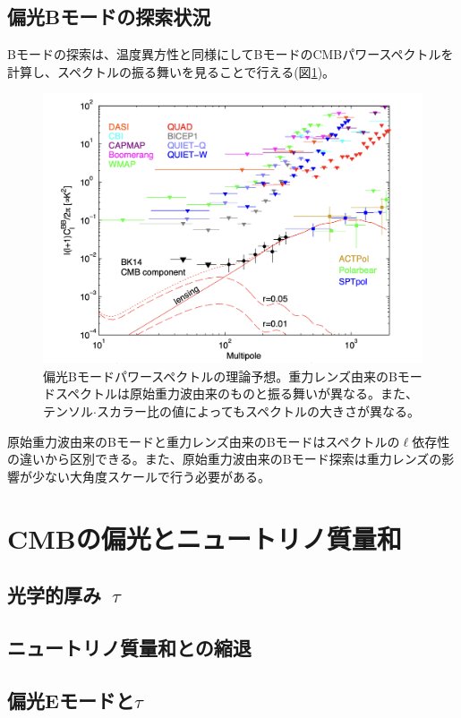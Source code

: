 \subsection{偏光Bモードの探索状況}
Bモードの探索は、温度異方性と同様にしてBモードのCMBパワースペクトルを計算し、スペクトルの振る舞いを見ることで行える(図\ref{bicep_paper})。
\begin{figure}[htbp]
  \centering
  \includegraphics[width=0.8\columnwidth]{2_cosmology/figs/bicep_ref.png}
  \caption{偏光Bモードパワースペクトルの理論予想\cite{bicep_Bmode}。重力レンズ由来のBモードスペクトルは原始重力波由来のものと振る舞いが異なる。また、テンソル$\cdot$スカラー比の値によってもスペクトルの大きさが異なる。}
  \label{bicep_paper}
\end{figure}
原始重力波由来のBモードと重力レンズ由来のBモードはスペクトルの$\ell$依存性の違いから区別できる。また、原始重力波由来のBモード探索は重力レンズの影響が少ない大角度スケールで行う必要がある。

\section{CMBの偏光とニュートリノ質量和}

\subsection{光学的厚み~$\tau$}

\subsection{ニュートリノ質量和との縮退}

\subsection{偏光Eモードと$\tau$}
\label{E_and_tau}
